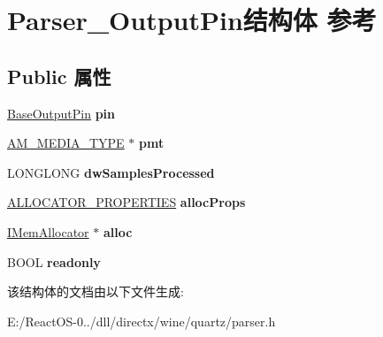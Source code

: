 \hypertarget{struct_parser___output_pin}{}\section{Parser\+\_\+\+Output\+Pin结构体 参考}
\label{struct_parser___output_pin}
\subsection*{Public 属性}
\begin{DoxyCompactItemize}
\item 
\mbox{\label{struct_parser___output_pin_a2d7751cd050ca62f820bd8acff0d02b8}} 
\hyperlink{struct_base_output_pin}{Base\+Output\+Pin} {\bfseries pin}
\item 
\mbox{\label{struct_parser___output_pin_a3974191416e43859a39650a2c1b15185}} 
\hyperlink{struct_a_m___m_e_d_i_a___t_y_p_e}{A\+M\+\_\+\+M\+E\+D\+I\+A\+\_\+\+T\+Y\+PE} $\ast$ {\bfseries pmt}
\item 
\mbox{\label{struct_parser___output_pin_a83c8a193405d6921a3a4c366dadef146}} 
L\+O\+N\+G\+L\+O\+NG {\bfseries dw\+Samples\+Processed}
\item 
\mbox{\label{struct_parser___output_pin_ae383a75cd0e79d9bd09b76dc3c5223e6}} 
\hyperlink{struct___allocator_properties}{A\+L\+L\+O\+C\+A\+T\+O\+R\+\_\+\+P\+R\+O\+P\+E\+R\+T\+I\+ES} {\bfseries alloc\+Props}
\item 
\mbox{\label{struct_parser___output_pin_a16c2a30ca1fd5086aa5f6d785b0aece6}} 
\hyperlink{interface_i_mem_allocator}{I\+Mem\+Allocator} $\ast$ {\bfseries alloc}
\item 
\mbox{\label{struct_parser___output_pin_affa8208627d1f0b2402335bdb699ef10}} 
B\+O\+OL {\bfseries readonly}
\end{DoxyCompactItemize}


该结构体的文档由以下文件生成\+:\begin{DoxyCompactItemize}
\item 
E\+:/\+React\+O\+S-\/0../dll/directx/wine/quartz/parser.\+h\end{DoxyCompactItemize}
